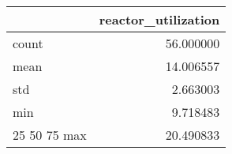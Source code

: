 \begin{tabular}{lr}
\toprule
 & reactor\_utilization \\
\midrule
count & 56.000000 \\
mean & 14.006557 \\
std & 2.663003 \\
min & 9.718483 \\
25%
50%
75%
max & 20.490833 \\
\bottomrule
\end{tabular}

